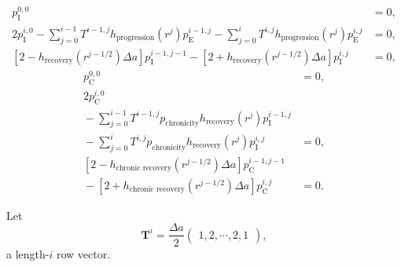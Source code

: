 \documentclass[12pt]{article}
\renewcommand{\vec}[1]{\mathbf{#1}}
\begin{document}
\begin{equation}
  \begin{split}
    p_{\mathrm{I}}^{0, 0} &= 0,
    \\
    2 p_{\mathrm{I}}^{i, 0}
    - \sum_{j = 0}^{i - 1}
    T^{i - 1, j} h_{\text{progression}}(r^j) p_{\mathrm{E}}^{i - 1, j}
    - \sum_{j = 0}^i
    T^{i, j} h_{\text{progression}}(r^j) p_{\mathrm{E}}^{i, j}
    &= 0,
    \\
    \left[2 - h_{\text{recovery}}(r^{j - 1 / 2}) \Delta a\right]
    p_{\mathrm{I}}^{i - 1, j - 1}
    - \left[2 + h_{\text{recovery}}(r^{j - 1 / 2}) \Delta a\right]
    p_{\mathrm{I}}^{i, j}
    &= 0,
  \end{split}
\end{equation}
\begin{equation}
  \begin{split}
    p_{\mathrm{C}}^{0, 0} &= 0,
    \\
    2 p_{\mathrm{C}}^{i, 0}
    \\ {}
    - \sum_{j = 0}^{i - 1}
    T^{i - 1, j} p_{\text{chronicity}} h_{\text{recovery}}(r^j)
    p_{\mathrm{I}}^{i - 1, j}
    \\ {}
    - \sum_{j = 0}^i
    T^{i, j} p_{\text{chronicity}} h_{\text{recovery}}(r^j)
    p_{\mathrm{I}}^{i, j}
    &= 0,
    \\
    \left[2 - h_{\text{chronic recovery}}(r^{j - 1 / 2}) \Delta a\right]
    p_{\mathrm{C}}^{i - 1, j - 1}
    \\ {}
    - \left[2 + h_{\text{chronic recovery}}(r^{j - 1 / 2}) \Delta a\right]
    p_{\mathrm{C}}^{i, j}
    &= 0.
  \end{split}
\end{equation}

Let
\begin{equation}
  \vec{T}^i =
  \frac{\Delta a}{2}
  \begin{pmatrix}
    1, 2, \cdots, 2, 1
  \end{pmatrix},
\end{equation}
a length-$i$ row vector.



\end{document}
